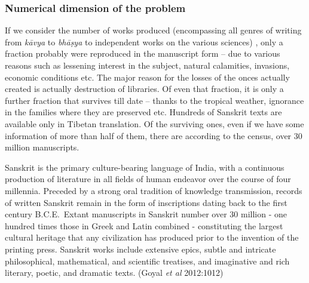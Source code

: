 \newpage

\subsubsection{Numerical dimension of the problem}

{\leftskip=10pt\par}


If we consider the number of works produced (encompassing all genres of writing from {\sl kāvya} to {\sl bhāṣya} to independent works on the various sciences) , only a fraction probably were reproduced in the manuscript form – due to various reasons such as lessening interest in the subject, natural calamities, invasions, economic conditions etc. The major reason for the losses of the onces actually created is actually destruction of libraries.  Of even that fraction, it is only a further fraction that survives till date – thanks to the tropical weather, ignorance in the families where they are preserved etc. Hundreds of Sanskrit texts are available only in Tibetan translation. Of the surviving ones, even if we have some information of more than half of them, there are according to the census, over 30 million manuscripts. 
\begin{myquote}
\eleven
Sanskrit is the primary culture-bearing language of India, with a continuous production of literature in all fields of human endeavor over the course of four millennia. Preceded by a strong oral tradition of knowledge transmission, records of written Sanskrit remain in the form of inscriptions dating back to the first century B.C.E.\ Extant manuscripts in Sanskrit number over 30 million - one hundred times those in Greek and Latin combined - constituting the largest cultural heritage that any civilization has produced prior to the invention of the printing press. Sanskrit works include extensive epics, subtle and intricate philosophical, mathematical, and scientific treatises, and imaginative and rich literary, poetic, and dramatic texts.	\hfill (Goyal {\sl et al} 2012:1012)
\end{myquote}

